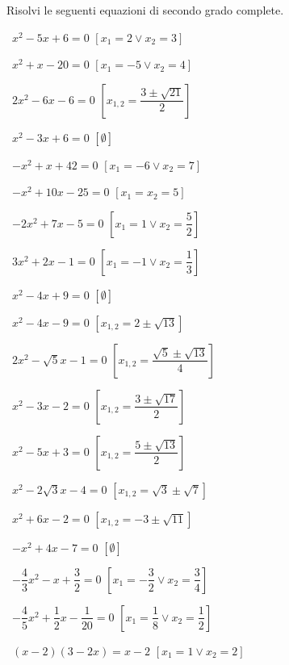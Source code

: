 \begin{esercizio}[\Ast]
 \label{ese:3.12}
Risolvi le seguenti equazioni di secondo grado complete.
\begin{multicols}{2}
 \begin{enumeratea}
 \item~\(x^{2}-5 x + 6=0\)
  \hfill\(\left[x_{1} = 2 \vee x_{2} = 3\right]\)
 \item~\(x^{2} + x-20=0\)
  \hfill\(\left[x_{1} =-5 \vee x_{2} = 4\right]\)
 \item~\(2 x^{2}-6 x-6=0\)
  \hfill\(\left[x_{1,2} = \dfrac{3 \pm \sqrt{21}}{2}\right]\)
 \item~\(x^{2}-3 x + 6=0\)
  \hfill\(\left[\emptyset\right]\)
 \item~\(- x^{2} + x + 42=0\)
  \hfill\(\left[x_{1} =-6 \vee x_{2} = 7\right]\)
 \item~\(- x^{2} + 10 x-25=0\)
  \hfill\(\left[x_{1} = x_{2} = 5\right]\)
 \item~\(- 2 x^{2} + 7 x-5=0\)
  \hfill\(\left[x_{1} = 1 \vee x_{2} = \dfrac{5}{2}\right]\)
 \item~\(3 x^{2} + 2 x-1=0\)
  \hfill\(\left[x_{1} =-1 \vee x_{2} = \dfrac{1}{3}\right]\)
 \item~\(x^{2}-4 x + 9 = 0\)
  \hfill\(\left[\emptyset\right]\)
 \item~\(x^{2}-4 x-9 = 0\)
  \hfill\(\left[x_{1,2} = 2 \pm \sqrt{13}\right]\)
 \item~\(2 x^{2}-\sqrt{5} x-1 = 0\)
  \hfill\(\left[x_{1,2} = \dfrac{\sqrt{5} \pm \sqrt{13}}{4}\right]\)
 \item~\(x^{2}-3 x-2=0\)
  \hfill\(\left[x_{1,2} = \dfrac{3 \pm \sqrt{17}}{2}\right]\)
 \item~\(x^{2}-5 x + 3 = 0\)
  \hfill\(\left[x_{1,2} = \dfrac{5 \pm \sqrt{13}}{2}\right]\)
 \item~\(x^{2}-2 \sqrt{3} x-4=0\)
  \hfill\(\left[x_{1,2} = \sqrt{3} \pm \sqrt{7}\right]\)
 \item~\(x^{2} + 6 x-2 = 0\)
  \hfill\(\left[x_{1,2} =-3 \pm \sqrt{11}\right]\)
 \item~\(- x^{2} + 4 x-7=0\)
  \hfill\(\left[\emptyset\right]\)
 \item~\(- \dfrac{4}{3} x^{2}-x + \dfrac{3}{2}=0\)
  \hfill\(\left[x_{1} =-\dfrac{3}{2} \vee x_{2} = \dfrac{3}{4}\right]\)
 \item~\(- \dfrac{4}{5} x^{2} + \dfrac{1}{2} x-\dfrac{1}{20}=0\)
  \hfill\(\left[x_{1} = \dfrac{1}{8} \vee x_{2} = \dfrac{1}{2}\right]\)
 \item~\((x-2) (3-2 x) = x-2\)
  \hfill\(\left[x_{1} = 1 \vee x_{2} = 2\right]\)
 \end{enumeratea}
 \end{multicols}
\end{esercizio}

